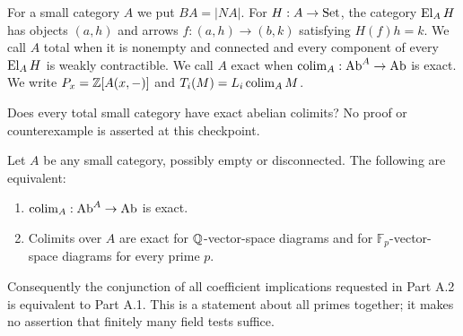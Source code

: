 \begin{definition}\label{A:conventions}
For a small category $A$ we put $BA=|NA|$. For $H:A\to\mathrm{Set}$, the category $\operatorname{El}_AH$ has objects $(a,h)$ and arrows $f:(a,h)\to(b,k)$ satisfying $H(f)h=k$. We call $A$ total when it is nonempty and connected and every component of every $\operatorname{El}_AH$ is weakly contractible. We call $A$ exact when $\operatorname*{colim}_A:\mathrm{Ab}^A\to\mathrm{Ab}$ is exact. We write $P_x=\mathbb Z[A(x,-)]$ and $T_i(M)=L_i\operatorname*{colim}_A M$.
\end{definition}
\begin{unresolved}\label{A:main}
Does every total small category have exact abelian colimits? No proof or counterexample is asserted at this checkpoint.
\end{unresolved}

\begin{theorem}\label{A:fields}
Let $A$ be any small category, possibly empty or disconnected. The following are equivalent:
\begin{enumerate}[label=(\roman*)]
\item $\operatorname*{colim}_A:\mathrm{Ab}^A\to\mathrm{Ab}$ is exact.
\item Colimits over $A$ are exact for $\mathbb Q$-vector-space diagrams and for $\mathbb F_p$-vector-space diagrams for every prime $p$.
\end{enumerate}
Consequently the conjunction of all coefficient implications requested in Part A.2 is equivalent to Part A.1. This is a statement about all primes together; it makes no assertion that finitely many field tests suffice.
\end{theorem}
